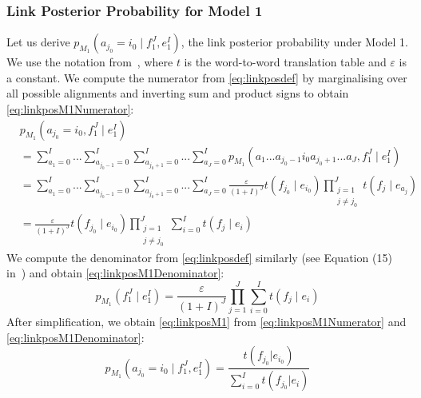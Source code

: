 \subsubsection{Link Posterior Probability for Model 1}

Let us derive $p_{M_1}(a_{j_0} = i_0 \mid f_1^J, e_1^I)$,
the link posterior probability under Model 1. We use the notation
from~\citep{brown-dellapietra-dellapietra-mercer-1993}, where $t$ is
the word-to-word translation table and $\varepsilon$ is a constant. We compute the
numerator from
\autoref{eq:linkposdef} by marginalising over all possible alignments and
inverting sum and product signs to obtain \autoref{eq:linkposM1Numerator}:
%
\begin{align}
  & p_{M_1}(a_{j_0}=i_0,f_1^J \mid e_1^I) \nonumber \\
  &= \sum_{a_1 = 0}^{I} ... \sum_{a_{j_0-1} = 0}^{I} \sum_{a_{j_0+1} = 0}^{I} ... \sum_{a_J = 0}^{I} p_{M_1}(a_1 ... a_{j_0-1} i_0 a_{j_0+1} ... a_J,f_1^J \mid e_1^I) \nonumber \\
  &= \sum_{a_1 = 0}^{I} ... \sum_{a_{j_0-1} = 0}^{I} \sum_{a_{j_0+1} = 0}^{I} ... \sum_{a_J = 0}^{I} \frac{\varepsilon}{(1+I)^J} t(f_{j_0} \mid e_{i_0}) \prod_{\substack{j = 1 \\ j \neq j_0}}^J t(f_j \mid e_{a_j}) \nonumber \\
  &= \frac{\varepsilon}{(1+I)^J} t(f_{j_0} \mid e_{i_0}) \prod_{\substack{j = 1 \\ j \neq j_0}}^J \sum_{i=0}^I t(f_j \mid e_i) \label{eq:linkposM1Numerator}
\end{align}
%
We compute the denominator from \autoref{eq:linkposdef}
similarly (see Equation (15)
in~\citep{brown-dellapietra-dellapietra-mercer-1993}) and obtain
\autoref{eq:linkposM1Denominator}:
%
\begin{equation} \label{eq:linkposM1Denominator}
  p_{M_1}(f_1^J \mid e_1^I) = \frac{\varepsilon}{(1+I)^J} \prod_{j=1}^J \sum_{i=0}^I t(f_j \mid e_i)
\end{equation}
%
After simplification, we obtain \autoref{eq:linkposM1} from
\autoref{eq:linkposM1Numerator} and \autoref{eq:linkposM1Denominator}:
%
\begin{equation} \label{eq:linkposM1}
  p_{M_1}(a_{j_0} = i_0 \mid f_1^J, e_1^I) = \frac{t(f_{j_0}|e_{i_0})}{\sum_{i=0}^I t(f_{j_0}|e_i)}
\end{equation}
%

